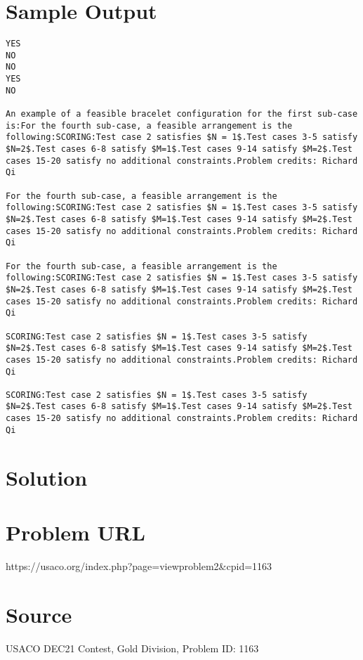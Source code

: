 \documentclass[12pt]{article}
\begin{document}
\section*{Sample Output}
\begin{verbatim}
YES
NO
NO
YES
NO

An example of a feasible bracelet configuration for the first sub-case is:For the fourth sub-case, a feasible arrangement is the following:SCORING:Test case 2 satisfies $N = 1$.Test cases 3-5 satisfy $N=2$.Test cases 6-8 satisfy $M=1$.Test cases 9-14 satisfy $M=2$.Test cases 15-20 satisfy no additional constraints.Problem credits: Richard Qi

For the fourth sub-case, a feasible arrangement is the following:SCORING:Test case 2 satisfies $N = 1$.Test cases 3-5 satisfy $N=2$.Test cases 6-8 satisfy $M=1$.Test cases 9-14 satisfy $M=2$.Test cases 15-20 satisfy no additional constraints.Problem credits: Richard Qi

For the fourth sub-case, a feasible arrangement is the following:SCORING:Test case 2 satisfies $N = 1$.Test cases 3-5 satisfy $N=2$.Test cases 6-8 satisfy $M=1$.Test cases 9-14 satisfy $M=2$.Test cases 15-20 satisfy no additional constraints.Problem credits: Richard Qi

SCORING:Test case 2 satisfies $N = 1$.Test cases 3-5 satisfy $N=2$.Test cases 6-8 satisfy $M=1$.Test cases 9-14 satisfy $M=2$.Test cases 15-20 satisfy no additional constraints.Problem credits: Richard Qi

SCORING:Test case 2 satisfies $N = 1$.Test cases 3-5 satisfy $N=2$.Test cases 6-8 satisfy $M=1$.Test cases 9-14 satisfy $M=2$.Test cases 15-20 satisfy no additional constraints.Problem credits: Richard Qi
\end{verbatim}

\section*{Solution}


\section*{Problem URL}
https://usaco.org/index.php?page=viewproblem2&cpid=1163

\section*{Source}
USACO DEC21 Contest, Gold Division, Problem ID: 1163
\end{document}

